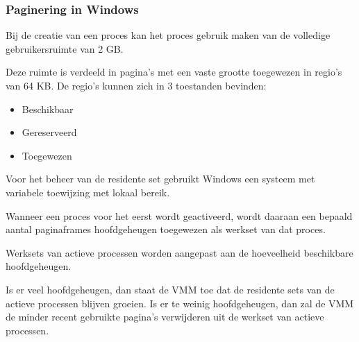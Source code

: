 \subsubsection{Paginering in Windows}

Bij de creatie van een proces kan het proces gebruik maken van de volledige gebruikersruimte van 2 GB.

Deze ruimte is verdeeld in pagina’s met een vaste grootte toegewezen in regio’s van 64 KB. De regio’s kunnen zich in 3 toestanden bevinden:

\begin{itemize}
\item Beschikbaar
\item Gereserveerd
\item Toegewezen
\end{itemize}

Voor het beheer van de residente set gebruikt Windows een systeem met variabele toewijzing met lokaal bereik.

Wanneer een proces voor het eerst wordt geactiveerd, wordt daaraan een bepaald aantal paginaframes hoofdgeheugen toegewezen als werkset van dat proces.

Werksets van actieve processen worden aangepast aan de hoeveelheid beschikbare hoofdgeheugen.

Is er veel hoofdgeheugen, dan staat de VMM toe dat de residente sets van de actieve processen blijven groeien. Is er te weinig hoofdgeheugen, dan zal de VMM de minder recent gebruikte pagina’s verwijderen uit de werkset van actieve processen.




